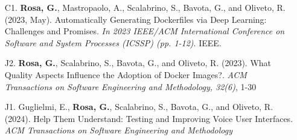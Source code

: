      \begin{itemize}
      \item[C1.] \textbf{Rosa, G.}, Mastropaolo, A., Scalabrino, S., Bavota, G., and Oliveto, R. (2023, May). Automatically Generating Dockerfiles via Deep Learning: Challenges and Promises. \emph{In 2023 IEEE/ACM International Conference on Software and System Processes (ICSSP) (pp. 1-12)}. IEEE.
      \item[J2.] \textbf{Rosa, G.}, Scalabrino, S., Bavota, G., and Oliveto, R. (2023). What Quality Aspects Influence the Adoption of Docker Images?. \emph{ACM Transactions on Software Engineering and Methodology, 32(6)}, 1-30
      \item[J1.] Guglielmi, E., \textbf{Rosa, G.}, Scalabrino, S., Bavota, G., and Oliveto, R. (2024). Help Them Understand: Testing and Improving Voice User Interfaces. \emph{ACM Transactions on Software Engineering and Methodology}
     \end{itemize}